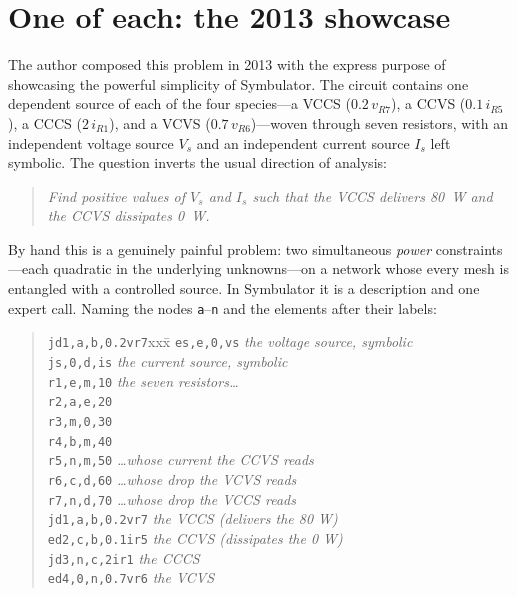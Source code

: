 \documentclass[11pt,oneside]{report}
\newcommand{\code}[1]{\texttt{#1}}
\begin{document}
\section{One of each: the 2013 showcase}
\label{sec:showcase2013}

The author composed this problem in 2013 with the express purpose of
showcasing the powerful simplicity of Symbulator. The circuit
contains one dependent source of each of the four species---a VCCS
($0.2\,v_{R7}$), a CCVS ($0.1\,i_{R5}$), a CCCS ($2\,i_{R1}$), and a
VCVS ($0.7\,v_{R6}$)---woven through seven resistors, with an
independent voltage source $V_s$ and an independent current source
$I_s$ left symbolic. The question inverts the usual direction of
analysis:

\begin{quote}
\emph{Find positive values of $V_s$ and $I_s$ such that the VCCS
delivers 80~W and the CCVS dissipates 0~W.}
\end{quote}

By hand this is a genuinely painful problem: two simultaneous
\emph{power} constraints---each quadratic in the underlying
unknowns---on a network whose every mesh is entangled with a
controlled source. In Symbulator it is a description and one expert
call. Naming the nodes \code{a}--\code{n} and the elements after
their labels:

\begin{quote}
\begin{tabbing}
\code{jd1,a,b,0.2vr7}xxx\=\kill
\code{es,e,0,vs}          \> \emph{the voltage source, symbolic} \\
\code{js,0,d,is}          \> \emph{the current source, symbolic} \\
\code{r1,e,m,10}          \> \emph{the seven resistors\ldots} \\
\code{r2,a,e,20} \\
\code{r3,m,0,30} \\
\code{r4,b,m,40} \\
\code{r5,n,m,50}          \> \emph{\ldots whose current the CCVS reads} \\
\code{r6,c,d,60}          \> \emph{\ldots whose drop the VCVS reads} \\
\code{r7,n,d,70}          \> \emph{\ldots whose drop the VCCS reads} \\
\code{jd1,a,b,0.2vr7}     \> \emph{the VCCS (delivers the 80 W)} \\
\code{ed2,c,b,0.1ir5}     \> \emph{the CCVS (dissipates the 0 W)} \\
\code{jd3,n,c,2ir1}       \> \emph{the CCCS} \\
\code{ed4,0,n,0.7vr6}     \> \emph{the VCVS}
\end{tabbing}
\end{quote}
\end{document}
